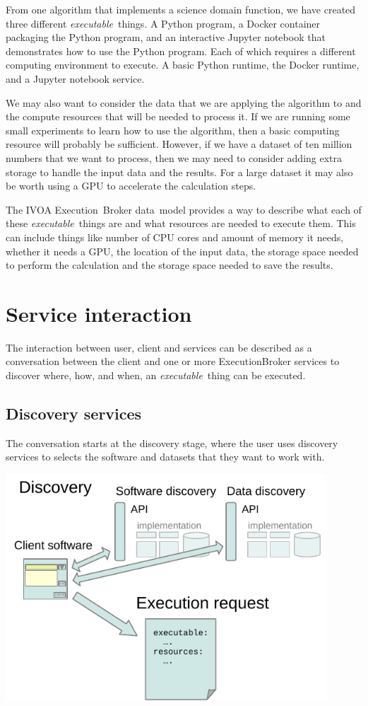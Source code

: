 \documentclass[11pt,a4paper]{ivoa}
\newcommand{\datamodel} {data~model}
\newcommand{\ivoa} {IVOA}
\newcommand{\execbrokerclass} {ExecutionBroker}
\newcommand{\executionbroker} {Execution~Broker}
\newcommand{\jupyternotebook} {Jupyter notebook}
\newcommand{\python} {Python}
\newcommand{\pythonprogram} {Python program}
\newcommand{\dockerruntime} {Docker runtime}
\newcommand{\dockercontainer} {Docker container}
\newcommand{\dataset} {dataset}
\newcommand{\executablething} {\textit{executable}~thing}
\newcommand{\cpu} {CPU}
\newcommand{\gpu} {GPU}
\begin{document}
From one algorithm that implements a science domain function, we have created three different \executablething{}s.
A \pythonprogram{}, a \dockercontainer{} packaging the \pythonprogram{}, and an interactive \jupyternotebook{}
that demonstrates how to use the \pythonprogram{}.
Each of which requires a different computing environment to execute.
A basic \python{} runtime, the \dockerruntime{}, and a \jupyternotebook{} service.

We may also want to consider the data that we are applying the algorithm to and the compute resources that
will be needed to process it.
If we are running some small experiments to learn how to use the algorithm, then a basic computing
resource will probably be sufficient.
However, if we have a \dataset{} of ten million numbers that we want to process, then we may
need to consider adding extra storage to handle the input data and the results.
For a large \dataset{} it may also be worth using a \gpu{} to accelerate the calculation steps.

The \ivoa{} \executionbroker{} \datamodel{} provides a way to describe what each of these \executablething{}s
are and what resources are needed to execute them.
This can include things like number of \cpu{} cores and amount of memory it needs,
whether it needs a \gpu{}, the location of the input data, the storage space needed to perform
the calculation and the storage space needed to save the results.

\section{Service interaction}
\label{service-interaction}

The interaction between user, client and services can be described as a conversation between the client
and one or more \execbrokerclass{} services to discover where, how, and when, an \executablething{} can be
executed.

\subsection{Discovery services}
\label{discovery-services}

The conversation starts at the discovery stage, where the user uses discovery services to
selects the software and \dataset{}s that they want to work with.

\includegraphics[width=0.9\textwidth]{diagrams/data-discovery.pdf}
\end{document}
